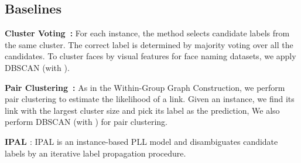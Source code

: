 \documentclass[letterpaper]{article} \usepackage{aaai20}  \usepackage{times}  \usepackage{helvet} \usepackage{courier}  \usepackage[hyphens]{url}  \usepackage{graphicx} \urlstyle{rm} \def\UrlFont{\rm}  \frenchspacing  \setlength{\pdfpagewidth}{8.5in}  \setlength{\pdfpageheight}{11in}  \frenchspacing
\begin{document}
\begin{table*}
  \caption{Performance Comparison on MPII-MD and M-VAD}
  \label{sample-table}
  \centering
{}
 \end{table*}





\subsection{Baselines}

\noindent\textbf{Cluster Voting~\cite{sander1998density}:} 
For each instance, the method selects
candidate labels from the same cluster.  The correct label is determined by majority voting over all the candidates. To cluster faces by visual features for face naming datasets, we apply DBSCAN (with ).


\noindent\textbf{Pair Clustering~\cite{sander1998density}:}
As in the Within-Group Graph Construction, we perform pair clustering to estimate the likelihood of a link. Given an instance, we find its link with the largest cluster size and pick its label as the prediction, We also perform DBSCAN (with ) for pair clustering.


\noindent\textbf{IPAL \cite{zhang2015solving}}: IPAL is an instance-based PLL model and disambiguates candidate labels by an iterative label propagation procedure.
\end{document}
